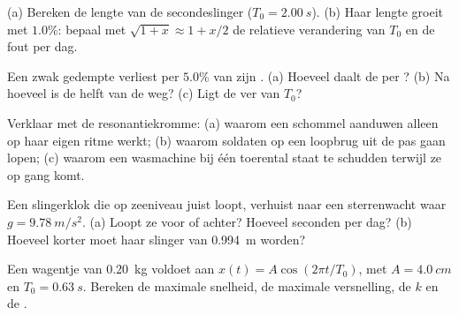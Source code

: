 \begin{exercise}[$\star\star$]\label{exo:g12:oscillators-and-time:9}
(a) Bereken de lengte van de secondeslinger ($T_0 = \qty{2.00}{s}$). (b) Haar
lengte groeit met $1.0\%$: bepaal met $\sqrt{1+x} \approx 1 + x/2$ de
relatieve verandering van $T_0$ en de fout per dag.
\end{exercise}

\begin{exercise}[$\star\star$]\label{exo:g12:oscillators-and-time:10}
Een zwak gedempte  verliest per  $5.0\%$ van zijn .
(a) Hoeveel daalt de  per ? (b) Na hoeveel  is de
helft van de  weg? (c) Ligt de  ver van $T_0$?
\end{exercise}

\begin{exercise}[$\star\star$]\label{exo:g12:oscillators-and-time:11}
Verklaar met de resonantiekromme: (a) waarom een schommel aanduwen alleen op
haar eigen ritme werkt; (b) waarom soldaten op een loopbrug uit de pas gaan
lopen; (c) waarom een wasmachine bij één toerental staat te schudden terwijl
ze op gang komt.
\end{exercise}

\begin{exercise}[$\star\star\star$]\label{exo:g12:oscillators-and-time:12}
Een slingerklok die op zeeniveau juist loopt, verhuist naar een sterrenwacht
waar $g = \qty{9.78}{m/s^2}$. (a) Loopt ze voor of achter? Hoeveel seconden
per dag? (b) Hoeveel korter moet haar slinger van \qty{0.994}{m} worden?
\end{exercise}

\begin{exercise}[$\star\star\star$]\label{exo:g12:oscillators-and-time:13}
Een wagentje van \qty{0.20}{kg} voldoet aan $x(t) = A\cos(2\pi t/T_0)$, met
$A = \qty{4.0}{cm}$ en $T_0 = \qty{0.63}{s}$. Bereken de maximale snelheid,
de maximale versnelling, de  $k$ en de .
\end{exercise}

